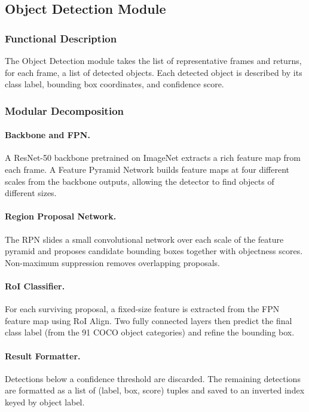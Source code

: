 \documentclass[12pt, a4paper]{report}
\begin{document}
\subsection{Object Detection Module}

\subsubsection{Functional Description}

The Object Detection module takes the list of representative frames and
returns, for each frame, a list of detected objects. Each detected object
is described by its class label, bounding box coordinates, and confidence
score.

\subsubsection{Modular Decomposition}

\paragraph{Backbone and FPN.}
A ResNet-50 backbone pretrained on ImageNet extracts a rich feature map
from each frame. A Feature Pyramid Network builds feature maps at four
different scales from the backbone outputs, allowing the detector to find
objects of different sizes.

\paragraph{Region Proposal Network.}
The RPN slides a small convolutional network over each scale of the feature
pyramid and proposes candidate bounding boxes together with objectness
scores. Non-maximum suppression removes overlapping proposals.

\paragraph{RoI Classifier.}
For each surviving proposal, a fixed-size feature is extracted from the
FPN feature map using RoI Align. Two fully connected layers then predict
the final class label (from the 91 COCO object categories) and refine
the bounding box.

\paragraph{Result Formatter.}
Detections below a confidence threshold are discarded. The remaining
detections are formatted as a list of (label, box, score) tuples and
saved to an inverted index keyed by object label.
\end{document}
